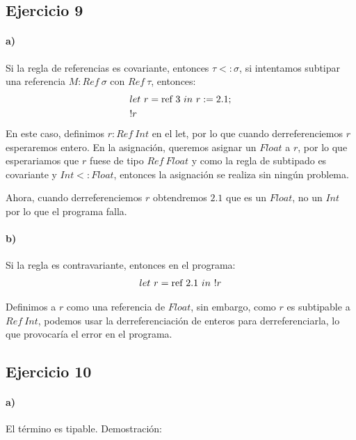 \documentclass[10pt,a4paper, landscape]{article}
\begin{document}
\subsection{Ejercicio 9}
\begin{multicols}{2}
	\paragraph{a)} Si la regla de referencias es covariante, entonces $\tau <: \sigma$, si intentamos subtipar una referencia $M:Ref~\sigma$ con $Ref~\tau$, entonces:
		\begin{align*}
		&let~r = \text{ref}~3~in~r := 2.1; \\
		&!r
		\end{align*}
		En este caso, definimos $r : Ref~Int$ en el let, por lo que cuando derreferenciemos $r$ esperaremos entero. En la asignación, queremos asignar un $Float$ a $r$, por lo que esperariamos que $r$ fuese de tipo $Ref~Float$ y como la regla de subtipado es covariante y $Int <: Float$, entonces la asignación se realiza sin ningún problema.
		
		Ahora, cuando derreferenciemos $r$ obtendremos $2.1$ que es un $Float$, no un $Int$ por lo que el programa falla.
		
		\vfill\null
		\columnbreak
		\paragraph{b)} Si la regla es contravariante, entonces en el programa:
		\begin{align*}
		let~r = \text{ref}~2.1~in~!r
		\end{align*}
		
		Definimos a $r$ como una referencia de $Float$, sin embargo, como $r$ es subtipable a $Ref~Int$, podemos usar la derreferenciación de enteros para derreferenciarla, lo que provocaría el error en el programa.
		
\end{multicols}

	\subsection{Ejercicio 10}
	\paragraph{a)} El término es tipable. Demostración:
	
\end{document}
